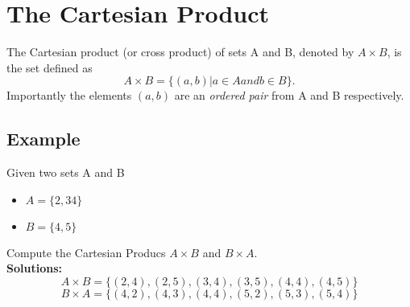 \documentclass[MASTER.tex]{subfiles}
\begin{document}
\section*{The Cartesian Product}
The Cartesian product (or cross product) of sets A and B, denoted by
$A \times B$, is the set defined as
\[A \times  B = \{(a, b) | a \in A and b \in B\}.\]
Importantly the elements $(a, b)$ are an \textit{ordered pair} from A and B respectively.
\subsection*{Example}
Given two sets A and B
\begin{itemize}
\item $A = \{2, 3 4\}$
\item $B = \{4, 5\}$
\end{itemize}
Compute the Cartesian Producs $A\times B$ and $B \times A$.\\
\textbf{Solutions:}
\[ A\times B = \{(2, 4),(2, 5),(3, 4),(3, 5),(4, 4),(4, 5)\}\]
\[ B\times A = \{(4, 2),(4, 3),(4, 4),(5, 2),(5, 3),(5, 4)\}\]
\end{document}
